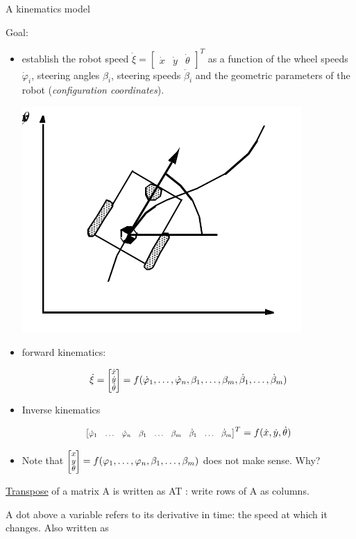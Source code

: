 \documentclass[compress]{beamer}
\newcommand{\colvec}[2][.8]{%
  \scalebox{#1}{%
    \renewcommand{\arraystretch}{.8}%
    $\begin{bmatrix}#2\end{bmatrix}$%
  }
}
\begin{document}
\begin{frame}{A kinematics model}

Goal:

\begin{itemize}
    \item establish the robot speed $\dot\xi = \begin{bmatrix} \dot{x} & \dot{y}
    & \dot{\theta}\end{bmatrix}^T$  as a function of the wheel speeds
        $\dot\varphi_i$, steering
  angles $\beta_i$, steering speeds $\dot\beta_i$ and the geometric parameters of the robot
  (\emph{configuration coordinates}).

        \begin{center}
            \includegraphics[width=0.4\linewidth]{kinematic_model}
        \end{center}

    \item forward kinematics:

\[
    \dot\xi = \colvec{\dot{x} \\ \dot{y} \\ \dot{\theta} } = f(\dot\varphi_1,\ldots,\dot\varphi_n,\beta_1,\ldots,\beta_m,\dot\beta_1,\ldots,\dot\beta_m)
\]

    \item Inverse kinematics

\[
        \colvec{\dot\varphi_1 & \ldots & \dot\varphi_n& \beta_1 & \ldots &
        \beta_m & \dot\beta_1 & \ldots & \dot\beta_m}^T = f(\dot{x},
        \dot{y},\dot\theta)
\]

    \item Note that 
    $\colvec{x \\ y \\ \theta } =
        f(\varphi_1,\ldots,\varphi_n,\beta_1,\ldots,\beta_m)$ does not make sense. Why?
\end{itemize}

\href{http://en.wikipedia.org/wiki/Transpose}{Transpose} of a matrix A
is written as AT : write rows of A as columns.

A dot above a variable refers to its derivative in time: the speed at
which it changes. Also written as

\end{frame}
\end{document}
